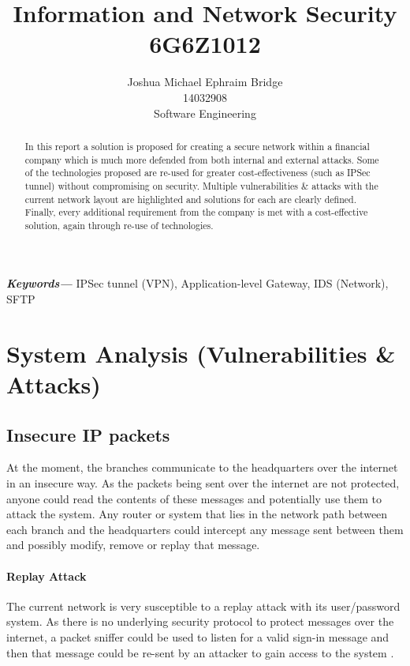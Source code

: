 \documentclass[11pt]{article}
\title{\vspace{2cm}\textbf{Information and Network Security}\\6G6Z1012}
\author{Joshua Michael Ephraim Bridge\\14032908\\Software Engineering}
\providecommand{\keywords}[1] {
  \small
  \textbf{\textit{Keywords---}} #1
}
\begin{document}
  \maketitle

  \vspace{1cm}

  \begin{abstract}
    In this report a solution is proposed for creating a secure network within a financial company which is much more defended from both internal and external attacks. Some of the technologies proposed are re-used for greater cost-effectiveness (such as IPSec tunnel) without compromising on security. Multiple vulnerabilities \& attacks with the current network layout are highlighted and solutions for each are clearly defined. Finally, every additional requirement from the company is met with a cost-effective solution, again through re-use of technologies.
  \end{abstract}

  \vspace{0.5cm}

  \keywords{IPSec tunnel (VPN), Application-level Gateway, IDS (Network), SFTP}

  \newpage


  \section{System Analysis (Vulnerabilities \& Attacks)}
    \subsection{Insecure IP packets}
      At the moment, the branches communicate to the headquarters over the internet in an insecure way. As the packets being sent over the internet are not protected, anyone could read the contents of these messages and potentially use them to attack the system. Any router or system that lies in the network path between each branch and the headquarters could intercept any message sent between them and possibly modify, remove or replay that message.

      \paragraph{Replay Attack}
        The current network is very susceptible to a replay attack with its user/password system. As there is no underlying security protocol to protect messages over the internet, a packet sniffer could be used to listen for a valid sign-in message and then that message could be re-sent by an attacker to gain access to the system \citep{owaspReplayAttack}.
\end{document}
